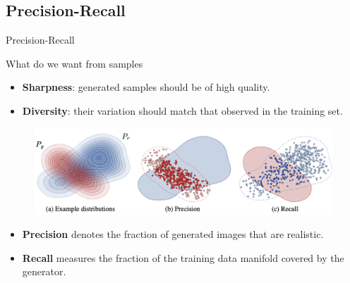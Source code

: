 \subsection{Precision-Recall}
\begin{frame}{Precision-Recall}
	\begin{block}{What do we want from samples}
		\begin{itemize}
			\item \textbf{Sharpness}: generated samples should be of high quality.
			\item \textbf{Diversity}: their variation should match that observed in the training set.
		\end{itemize}
	\end{block}
	\vspace{-0.5cm}
	\begin{figure}
		\includegraphics[width=0.95\linewidth]{figs/pr_curve}
	\end{figure}
	\vspace{-0.3cm}
	\begin{itemize}
		\item \textbf{Precision} denotes the fraction of generated images that are realistic.
		\item \textbf{Recall} measures the fraction of the training data manifold covered by the generator.
	\end{itemize}
\end{frame}
